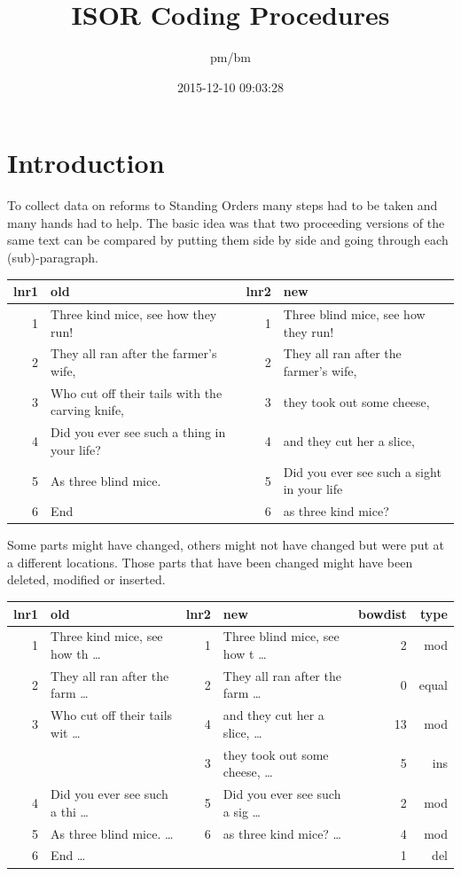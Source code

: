 \documentclass[10pt,]{article}
\title{ISOR Coding Procedures}
\author{pm/bm}
\date{2015-12-10 09:03:28}
\begin{document}
\maketitle

{
\hypersetup{linkcolor=black}
\setcounter{tocdepth}{2}
\tableofcontents
}
\makeatletter
\newcommand{\justified}{%
  \rightskip\z@skip%
  \leftskip\z@skip} \makeatother

\newpage

\section{Introduction}\label{introduction}

To collect data on reforms to Standing Orders many steps had to be taken
and many hands had to help. The basic idea was that two proceeding
versions of the same text can be compared by putting them side by side
and going through each (sub)-paragraph.

\begin{longtable}[c]{@{}rlrl@{}}
\toprule
lnr1 & old & lnr2 & new\tabularnewline
\midrule
\endhead
1 & Three kind mice, see how they run! & 1 & Three blind mice, see how
they run!\tabularnewline
2 & They all ran after the farmer's wife, & 2 & They all ran after the
farmer's wife,\tabularnewline
3 & Who cut off their tails with the carving knife, & 3 & they took out
some cheese,\tabularnewline
4 & Did you ever see such a thing in your life? & 4 & and they cut her a
slice,\tabularnewline
5 & As three blind mice. & 5 & Did you ever see such a sight in your
life\tabularnewline
6 & End & 6 & as three kind mice?\tabularnewline
\bottomrule
\end{longtable}

Some parts might have changed, others might not have changed but were
put at a different locations. Those parts that have been changed might
have been deleted, modified or inserted.

\begin{longtable}[c]{@{}rlrlrr@{}}
\toprule
lnr1 & old & lnr2 & new & bowdist & type\tabularnewline
\midrule
\endhead
1 & Three kind mice, see how th \ldots{} & 1 & Three blind mice, see how
t \ldots{} & 2 & mod\tabularnewline
2 & They all ran after the farm \ldots{} & 2 & They all ran after the
farm \ldots{} & 0 & equal\tabularnewline
3 & Who cut off their tails wit \ldots{} & 4 & and they cut her a slice,
\ldots{} & 13 & mod\tabularnewline
& & 3 & they took out some cheese, \ldots{} & 5 & ins\tabularnewline
4 & Did you ever see such a thi \ldots{} & 5 & Did you ever see such a
sig \ldots{} & 2 & mod\tabularnewline
5 & As three blind mice. \ldots{} & 6 & as three kind mice? \ldots{} & 4
& mod\tabularnewline
6 & End \ldots{} & & & 1 & del\tabularnewline
\bottomrule
\end{longtable}
\end{document}
